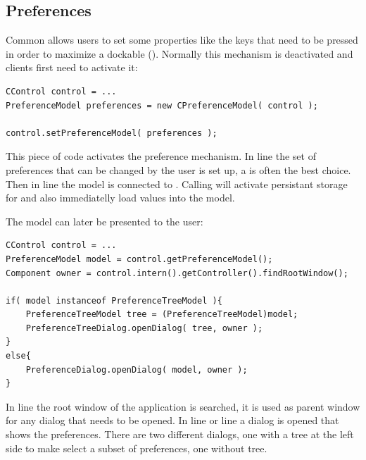 \subsection{Preferences} \label{sec:preferences}
Common allows users to set some properties like the keys that need to be pressed in order to maximize a dockable (). Normally this mechanism is deactivated and clients first need to activate it:
\begin{lstlisting}
CControl control = ...
PreferenceModel preferences = new CPreferenceModel( control );

control.setPreferenceModel( preferences );
\end{lstlisting}
This piece of code activates the preference mechanism. In line  the set of preferences that can be changed by the user is set up, a  is often the best choice. Then in line  the model is connected to . Calling  will activate persistant storage for  and also immediatelly load values into the model.

The model can later be presented to the user:
\begin{lstlisting}
CControl control = ...
PreferenceModel model = control.getPreferenceModel();
Component owner = control.intern().getController().findRootWindow();

if( model instanceof PreferenceTreeModel ){
	PreferenceTreeModel tree = (PreferenceTreeModel)model;
	PreferenceTreeDialog.openDialog( tree, owner );
}
else{
	PreferenceDialog.openDialog( model, owner );
}
\end{lstlisting}
In line  the root window of the application is searched, it is used as parent window for any dialog that needs to be opened. In line  or line  a dialog is opened that shows the preferences. There are two different dialogs, one with a tree at the left side to make select a subset of preferences, one without tree.


